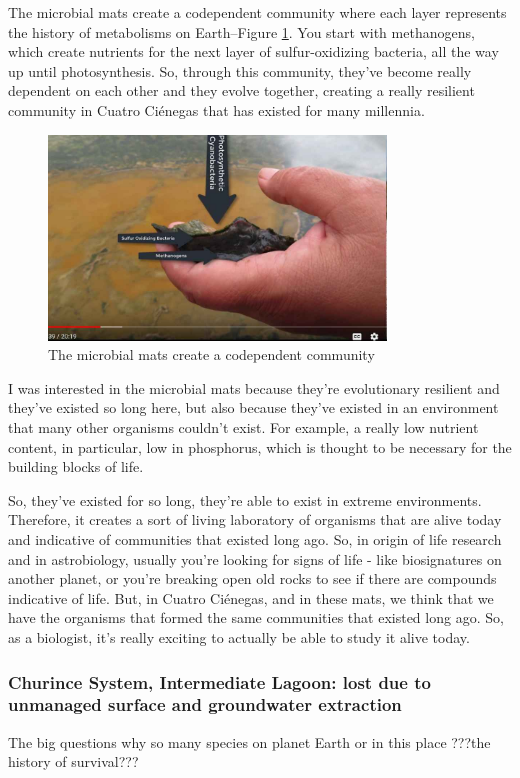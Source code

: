 \documentclass[]{article}
\begin{document}
The microbial mats create a codependent community where each layer represents the history of metabolisms on Earth--Figure \ref{fig:MicrobialMatDetail}. You start with methanogens, 
which create nutrients for the next layer of sulfur-oxidizing bacteria, all the way up until photosynthesis. So, through this community, they've become really dependent on each other and they evolve together, creating a really resilient community in Cuatro  Ci\'enegas that has existed for many millennia.

\begin{figure}[H]
	\caption{The microbial mats create a codependent community}\label{fig:MicrobialMatDetail}
	\includegraphics[width=0.8\textwidth]{MicrobialMatDetail}
\end{figure}

I was interested in the microbial mats because they're evolutionary resilient
and they've existed so long here, but also because they've existed in an environment that many other organisms couldn't exist. For example, a really low nutrient content, in particular, low in phosphorus, which is thought to be necessary for the building blocks of life.

So, they've existed for so long, they're able to exist in extreme environments. Therefore, it creates a sort of living laboratory of organisms that are alive today and indicative of communities that existed long ago. So, in origin of life research and in astrobiology, usually you're looking for signs of life - like biosignatures on another planet, or you're breaking open old rocks to see if there are compounds indicative of life. But, in Cuatro  Ci\'enegas, and in these mats, we think that we have the organisms that formed the same communities that existed long ago.  So, as a biologist, it's really exciting to actually be able to study it alive today.

\subsubsection{Churince System, Intermediate Lagoon: lost due to unmanaged surface and groundwater extraction}
The big questions why so many species on planet Earth or in this place
???the history of survival???
\end{document}

